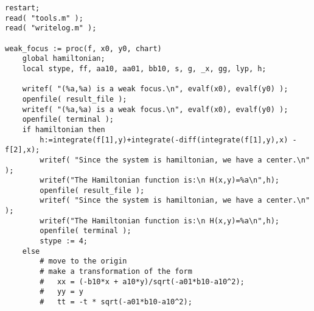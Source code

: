 \documentclass[a4paper,10pt]{article}
\begin{document}
\begin{lstlisting}[name=weakfocus]
restart;
read( "tools.m" );
read( "writelog.m" );

weak_focus := proc(f, x0, y0, chart)
    global hamiltonian;
    local stype, ff, aa10, aa01, bb10, s, g, _x, gg, lyp, h;

    writef( "(%a,%a) is a weak focus.\n", evalf(x0), evalf(y0) );
    openfile( result_file );
    writef( "(%a,%a) is a weak focus.\n", evalf(x0), evalf(y0) );
    openfile( terminal );
    if hamiltonian then
        h:=integrate(f[1],y)+integrate(-diff(integrate(f[1],y),x) - f[2],x);
        writef( "Since the system is hamiltonian, we have a center.\n" );
        writef("The Hamiltonian function is:\n H(x,y)=%a\n",h);
        openfile( result_file );
        writef( "Since the system is hamiltonian, we have a center.\n" );
        writef("The Hamiltonian function is:\n H(x,y)=%a\n",h);
        openfile( terminal );
        stype := 4;
    else
        # move to the origin
        # make a transformation of the form
        #   xx = (-b10*x + a10*y)/sqrt(-a01*b10-a10^2);
        #   yy = y
        #   tt = -t * sqrt(-a01*b10-a10^2);


\end{lstlisting}
\end{document}
